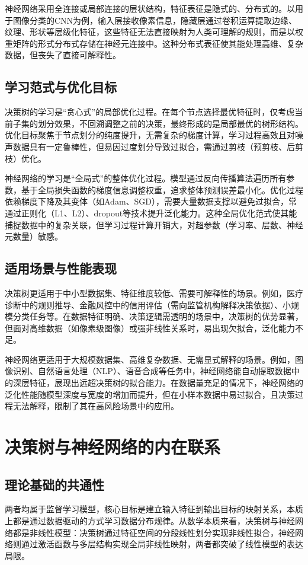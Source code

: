 神经网络采用全连接或局部连接的层状结构，特征表征是隐式的、分布式的。以用于图像分类的CNN为例，输入层接收像素信息，隐藏层通过卷积运算提取边缘、纹理、形状等层级化特征，这些特征无法直接映射为人类可理解的规则，而是以权重矩阵的形式分布式存储在神经元连接中。这种分布式表征使其能处理高维、复杂数据，但丧失了直接可解释性。

\subsection*{学习范式与优化目标}
决策树的学习是“贪心式”的局部优化过程。在每个节点选择最优特征时，仅考虑当前子集的划分效果，不回溯调整之前的决策，最终形成的是局部最优的树形结构。优化目标聚焦于节点划分的纯度提升，无需复杂的梯度计算，学习过程高效且对噪声数据具有一定鲁棒性，但易因过度划分导致过拟合，需通过剪枝（预剪枝、后剪枝）优化\cite{chen2016xgboost}。

神经网络的学习是“全局式”的整体优化过程。模型通过反向传播算法遍历所有参数，基于全局损失函数的梯度信息调整权重，追求整体预测误差最小化。优化过程依赖梯度下降及其变体（如Adam、SGD），需要大量数据支撑以避免过拟合，常通过正则化（L1、L2）、dropout等技术提升泛化能力。这种全局优化范式使其能捕捉数据中的复杂关联，但学习过程计算开销大，对超参数（学习率、层数、神经元数量）敏感\cite{cybenko1989approximation}。

\subsection*{适用场景与性能表现}
决策树更适用于中小型数据集、特征维度较低、需要可解释性的场景。例如，医疗诊断中的规则推导、金融风控中的信用评估（需向监管机构解释决策依据）、小规模分类任务等。在数据特征明确、决策逻辑需透明的场景中，决策树的优势显著，但面对高维数据（如像素级图像）或强非线性关系时，易出现欠拟合，泛化能力不足。

神经网络更适用于大规模数据集、高维复杂数据、无需显式解释的场景。例如，图像识别、自然语言处理（NLP）、语音合成等任务中，神经网络能自动提取数据中的深层特征，展现出远超决策树的拟合能力。在数据量充足的情况下，神经网络的泛化性能随模型深度与宽度的增加而提升，但在小样本数据中易过拟合，且决策过程无法解释，限制了其在高风险场景中的应用。

\section*{决策树与神经网络的内在联系}
\subsection*{理论基础的共通性}
两者均属于监督学习模型，核心目标是建立输入特征到输出目标的映射关系，本质上都是通过数据驱动的方式学习数据分布规律。从数学本质来看，决策树与神经网络都是非线性模型：决策树通过特征空间的分段线性划分实现非线性拟合，神经网络则通过激活函数与多层结构实现全局非线性映射，两者都突破了线性模型的表达局限。

